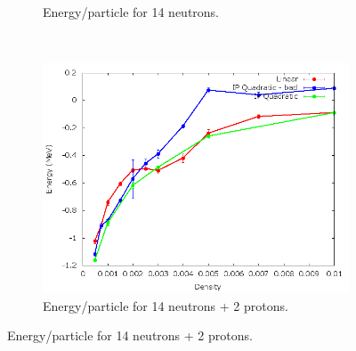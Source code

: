 \documentclass[12pt]{article}
\begin{document}
\begin{figure}[h!]
\begin{subfigure}{0.49\textwidth}
      \caption{Energy/particle for 14 neutrons.}
   \end{subfigure}
   ~
   \begin{subfigure}{0.49\textwidth}
      \includegraphics[width=\textwidth]{../14n2p.png}
      \caption{Energy/particle for 14 neutrons + 2 protons.}
   \end{subfigure}
\end{figure}
\newpage

\end{document}
